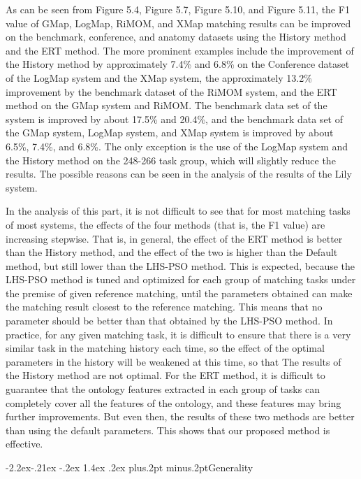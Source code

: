 \documentclass[twoside]{article}
\makeatletter
\def\subsubsection{\@startsection{subsubsection}{3}{\z@}%
 {-2.2ex\@plus -.21ex \@minus -.2ex}%
 {1.4ex \@plus.2ex}
{\normalfont\normalsize\protect\baselineskip=12pt plus.2pt minus.2pt\sl}}
\makeatother
\begin{document}
As can be seen from Figure 5.4, Figure 5.7, Figure 5.10, and Figure 5.11, the F1 value of GMap, LogMap, RiMOM, and XMap matching results can be improved on the benchmark, conference, and anatomy datasets using the History method and the ERT method. The more prominent examples include the improvement of the History method by approximately 7.4\% and 6.8\% on the Conference dataset of the LogMap system and the XMap system, the approximately 13.2\% improvement by the benchmark dataset of the RiMOM system, and the ERT method on the GMap system and RiMOM. The benchmark data set of the system is improved by about 17.5\% and 20.4\%, and the benchmark data set of the GMap system, LogMap system, and XMap system is improved by about 6.5\%, 7.4\%, and 6.8\%.
The only exception is the use of the LogMap system and the History method on the 248-266 task group, which will slightly reduce the results. The possible reasons can be seen in the analysis of the results of the Lily system.

In the analysis of this part, it is not difficult to see that for most matching tasks of most systems, the effects of the four methods (that is, the F1 value) are increasing stepwise.
That is, in general, the effect of the ERT method is better than the History method, and the effect of the two is higher than the Default method, but still lower than the LHS-PSO method.
This is expected, because the LHS-PSO method is tuned and optimized for each group of matching tasks under the premise of given reference matching, until the parameters obtained can make the matching result closest to the reference matching.
This means that no parameter should be better than that obtained by the LHS-PSO method.
In practice, for any given matching task, it is difficult to ensure that there is a very similar task in the matching history each time, so the effect of the optimal parameters in the history will be weakened at this time, so that The results of the History method are not optimal.
For the ERT method, it is difficult to guarantee that the ontology features extracted in each group of tasks can completely cover all the features of the ontology, and these features may bring further improvements.
But even then, the results of these two methods are better than using the default parameters.
This shows that our proposed method is effective.

\subsubsection{Generality}
\end{document}
